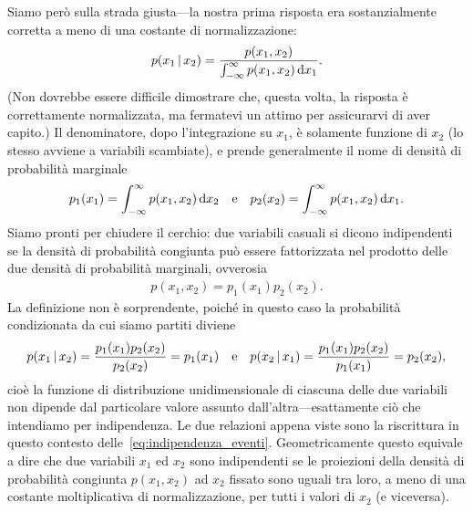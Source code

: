 Siamo però sulla strada giusta---la nostra prima risposta era sostanzialmente
corretta a meno di una costante di normalizzazione:
\begin{align}\label{eq:prob_cond_variabili}
  p(x_1 \cond x_2) =
  \frac{p(x_1, x_2)}{\int_{-\infty}^{\infty} p(x_1, x_2) \diff[x_1]}.
\end{align}
(Non dovrebbe essere difficile dimostrare che, questa volta, la risposta
è correttamente normalizzata, ma fermatevi un attimo per assicurarvi di aver
capito.) Il denominatore, dopo l'integrazione su $x_1$, è solamente
funzione di $x_2$ (lo stesso avviene a variabili scambiate), e prende
generalmente il nome di densità di probabilità marginale
\begin{align}
  p_1(x_1) = \int_{-\infty}^{\infty} p(x_1, x_2) \diff[x_2] \quad \text{e} \quad
  p_2(x_2) = \int_{-\infty}^{\infty} p(x_1, x_2) \diff[x_1].
\end{align}
Siamo pronti per chiudere il cerchio: due variabili casuali si dicono indipendenti se
la densità di probabilità congiunta può essere fattorizzata nel prodotto
delle due densità di probabilità marginali, ovverosia
\begin{align}\label{eq:indipendenza_variabili}
  p(x_1, x_2) = p_1(x_1) p_2(x_2).
\end{align}
La definizione non è sorprendente, poiché in questo caso la probabilità
condizionata da cui siamo partiti diviene
\begin{align*}
  p(x_1 \cond x_2) = \frac{p_1(x_1) p_2(x_2)}{p_2(x_2)} = p_1(x_1)
  \quad \text{e} \quad
  p(x_2 \cond x_1) = \frac{p_1(x_1) p_2(x_2)}{p_1(x_1)} = p_2(x_2),
\end{align*}
cioè la funzione di distribuzione unidimensionale di ciascuna delle due
variabili non dipende dal particolare valore assunto dall'altra---esattamente
ciò che intendiamo per indipendenza. Le due relazioni appena viste sono
la riscrittura in questo contesto delle~\eqref{eq:indipendenza_eventi}.
Geometricamente questo equivale a dire che due variabili $x_1$ ed $x_2$ sono
indipendenti se le proiezioni della densità di probabilità congiunta
$p(x_1, x_2)$ ad $x_2$ fissato sono uguali tra loro, a meno di una costante
moltiplicativa di normalizzazione, per tutti i valori di $x_2$ (e viceversa).

